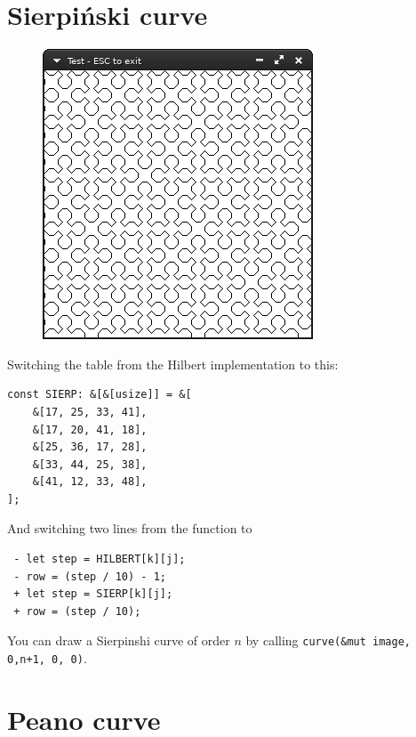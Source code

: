 \documentclass[12pt,openany,a4,usenames,dvipsnames]{book}
\begin{document}
\section{Sierpiński curve}
\begin{figure}[H]
  \centering
  \includegraphics[keepaspectratio,scale=1]{figures/sierpinshi.png}
\end{figure}

Switching the table from the Hilbert implementation to this:

\begin{verbatim}
const SIERP: &[&[usize]] = &[
    &[17, 25, 33, 41],
    &[17, 20, 41, 18],
    &[25, 36, 17, 28],
    &[33, 44, 25, 38],
    &[41, 12, 33, 48],
];
\end{verbatim}
And switching two lines from the function to
\begin{verbatim}
 - let step = HILBERT[k][j];
 - row = (step / 10) - 1;
 + let step = SIERP[k][j];
 + row = (step / 10);
\end{verbatim}
You can draw a Sierpinshi curve of order $n$ by calling \texttt{curve(\&mut image, 0,n+1, 0, 0)}.
\section{Peano curve}
\end{document}
